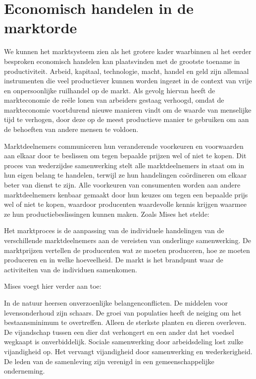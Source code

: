 \hypertarget{economisch-handelen-in-de-marktorde}{%
\section{Economisch handelen in de marktorde}\label{economisch-handelen-in-de-marktorde}}

We kunnen het marktsysteem zien als het grotere kader waarbinnen al het eerder besproken economisch handelen kan plaatsvinden met de grootste toename in productiviteit. Arbeid, kapitaal, technologie, macht, handel en geld zijn allemaal instrumenten die veel productiever kunnen worden ingezet in de context van vrije en onpersoonlijke ruilhandel op de markt. Als gevolg hiervan heeft de markteconomie de reële lonen van arbeiders gestaag verhoogd, omdat de markteconomie voortdurend nieuwe manieren vindt om de waarde van menselijke tijd te verhogen, door deze op de meest productieve manier te gebruiken om aan de behoeften van andere mensen te voldoen.

Marktdeelnemers communiceren hun veranderende voorkeuren en voorwaarden aan elkaar door te beslissen om tegen bepaalde prijzen wel of niet te kopen. Dit proces van wederzijdse samenwerking stelt alle marktdeelnemers in staat om in hun eigen belang te handelen, terwijl ze hun handelingen coördineren om elkaar beter van dienst te zijn. Alle voorkeuren van consumenten worden aan andere marktdeelnemers kenbaar gemaakt door hun keuzes om tegen een bepaalde prijs wel of niet te kopen, waardoor producenten waardevolle kennis krijgen waarmee ze hun productiebeslissingen kunnen maken. Zoals Mises het stelde:

\begin{blockquotebox}
    Het marktproces is de aanpassing van de individuele handelingen van de verschillende marktdeelnemers aan de vereisten van onderlinge samenwerking. De marktprijzen vertellen de producenten wat ze moeten produceren, hoe ze moeten produceren en in welke hoeveelheid. De markt is het brandpunt waar de activiteiten van de individuen samenkomen.\footnotemark    
\end{blockquotebox}
\autocite{125}

Mises voegt hier verder aan toe:

\begin{blockquotebox}
    In de natuur heersen onverzoenlijke belangenconflicten. De middelen voor levensonderhoud zijn schaars. De groei van populaties heeft de neiging om het bestaansminimum te overtreffen. Alleen de sterkste planten en dieren overleven. De vijandschap tussen een dier dat verhongert en een ander dat het voedsel wegkaapt is onverbiddelijk. Sociale samenwerking door arbeidsdeling lost zulke vijandigheid op. Het vervangt vijandigheid door samenwerking en wederkerigheid. De leden van de samenleving zijn verenigd in een gemeenschappelijke onderneming.\footnotemark    
\end{blockquotebox}
\autocite{126}

